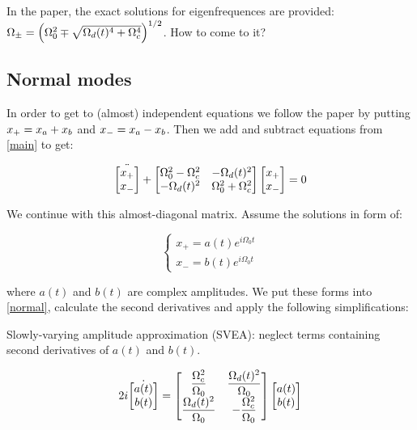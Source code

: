 \begin{QUESTION}
In the paper, the exact solutions for eigenfrequences are provided: \(\Omega_{\pm} = \left(\Omega_0^2
\mp \sqrt{\Omega_d(t)^4 + \Omega_c^4}\right)^{1/2}\). How to come to it?
\end{QUESTION}

\subsection{Normal modes}

In order to get to (almost) independent equations we follow the paper by putting $x_+ = x_a + x_b$
and $x_- = x_a - x_b$.  Then we add and subtract equations from \ref{main} to get:


\begin{equation}
\ddot{\begin{bmatrix}
  x_+ \\
  x_-
\end{bmatrix}}
+
\begin{bmatrix}
  \Omega_0^2 - \Omega_c^2 & -\Omega_d(t)^2 \\
  -\Omega_d(t)^2 & \Omega_0^2 + \Omega_c^2
\end{bmatrix}
\begin{bmatrix}
  x_+ \\
  x_-
\end{bmatrix}
= 0
\label{normal}
\end{equation}


We continue with this almost-diagonal matrix. Assume the solutions in form of:

\[
  \begin{cases}
    x_+ = a(t)e^{i\Omega_0 t} \\
    x_- = b(t)e^{i\Omega_0 t}
  \end{cases}
\]

where $a(t)$ and $b(t)$ are complex amplitudes. We put these forms into \ref{normal}, calculate the
second derivatives and apply the following simplifications:

\ls Slowly-varying amplitude approximation (SVEA): neglect terms containing second derivatives of
$a(t)$ and $b(t)$.
\le


\[
2i
\dot{\begin{bmatrix}
  a(t) \\
  b(t)
\end{bmatrix}}
=
\begin{bmatrix}
  \displaystyle \frac{\Omega_c^2}{\Omega_0} & \displaystyle \frac{\Omega_d(t)^2}{\Omega_0} \\
  \displaystyle \frac{\Omega_d(t)^2}{\Omega_0} & \displaystyle -\frac{\Omega_c^2}{\Omega_0}
\end{bmatrix}
\begin{bmatrix}
  a(t) \\
  b(t)
\end{bmatrix}
\]

